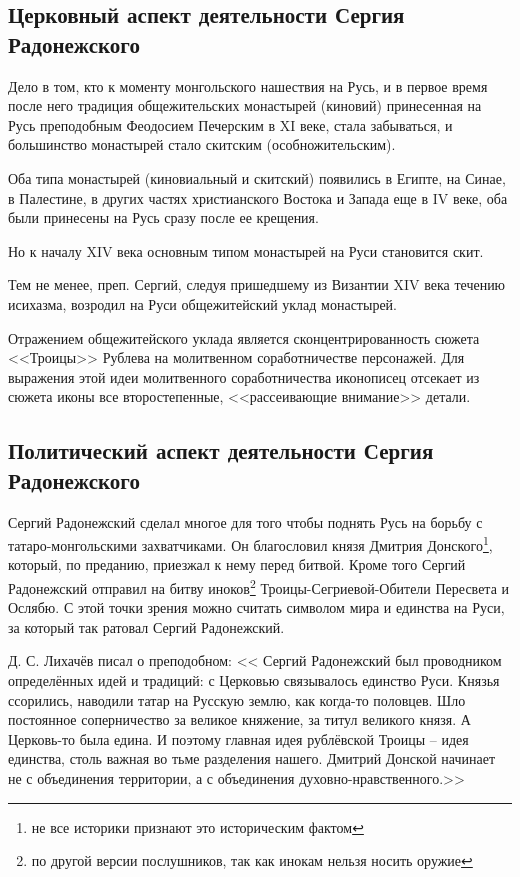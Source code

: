 \documentclass[12pt]{article}
\begin{document}
  \subsection{Церковный аспект деятельности Сергия Радонежского}
  Дело в том, кто к моменту монгольского нашествия на Русь, и в первое время после него традиция общежительских монастырей (киновий) принесенная на Русь преподобным Феодосием Печерским в XI веке, стала забываться, и большинство монастырей стало скитским (особножительским).

  Оба типа монастырей (киновиальный и скитский) появились в Египте, на Синае, в Палестине, в других частях христианского Востока и Запада еще в IV веке, оба были принесены на Русь сразу после ее крещения.

  Но к началу XIV века основным типом монастырей на Руси становится скит.

  Тем не менее, преп. Сергий, следуя пришедшему из Византии XIV века течению исихазма, возродил на Руси общежитейский уклад монастырей.

  Отражением общежитейского уклада является сконцентрированность сюжета <<Троицы>> Рублева на молитвенном соработничестве персонажей.
  Для выражения этой идеи молитвенного соработничества иконописец отсекает из сюжета иконы все второстепенные,
  <<рассеивающие внимание>> детали.

  \subsection{Политический аспект деятельности Сергия Радонежского}

  Сергий Радонежский сделал многое для того чтобы поднять Русь на борьбу с татаро-монгольскими захватчиками.
  Он благословил князя Дмитрия Донского\footnote{не все историки признают это историческим фактом},
  который, по преданию, приезжал к нему перед битвой.
  Кроме того Сергий Радонежский отправил на битву иноков\footnote{по другой версии послушников, так как инокам нельзя носить оружие}
  Троицы-Сегриевой-Обители Пересвета и Ослябю.
  С этой точки зрения можно считать символом мира и единства на Руси, за который так ратовал Сергий Радонежский.

  Д. С. Лихачёв писал о преподобном: <<%
  Сергий Радонежский был проводником определённых идей и традиций: с Церковью связывалось единство Руси.
  Князья ссорились, наводили татар на Русскую землю, как когда-то половцев.
  Шло постоянное соперничество за великое княжение, за титул великого князя.
  А Церковь-то была едина.
  И поэтому главная идея рублёвской Троицы -- идея единства, столь важная во тьме разделения нашего.
  Дмитрий Донской начинает не с объединения территории, а с объединения духовно-нравственного.>>
\end{document}
